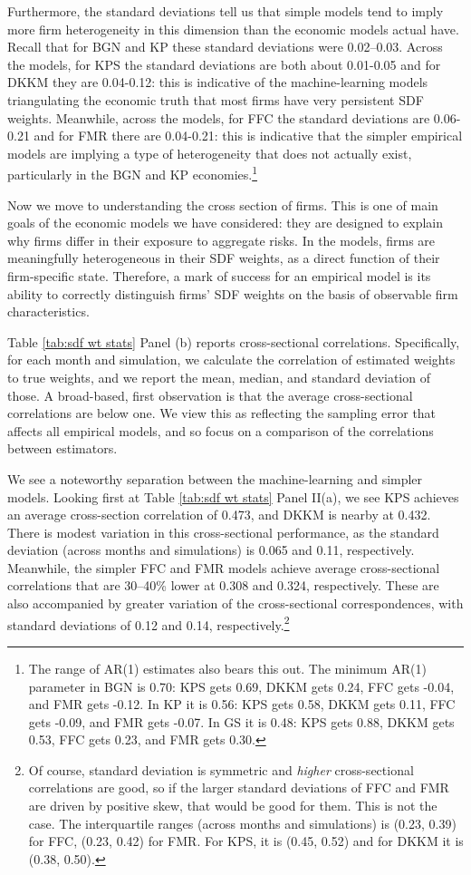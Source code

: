 \documentclass[12pt]{scrarticle}
\begin{document}
Furthermore, the standard deviations tell us that simple models tend to imply more firm heterogeneity in this dimension than the economic models actual have. Recall that for BGN and KP these standard deviations were 0.02--0.03. Across the models, for KPS the standard deviations are both about 0.01-0.05 and for DKKM they are 0.04-0.12: this is indicative of the machine-learning models triangulating the economic truth that most firms have very persistent SDF weights. Meanwhile, across the models, for FFC the standard deviations are 0.06-0.21 and for FMR there are 0.04-0.21: this is indicative that the simpler empirical models are implying a type of heterogeneity that does not actually exist, particularly in the BGN and KP economies.\footnote{The range of AR(1) estimates also bears this out. The minimum AR(1) parameter in BGN is 0.70: KPS gets 0.69, DKKM gets 0.24, FFC gets -0.04, and FMR gets -0.12. In KP it is 0.56: KPS gets 0.58, DKKM gets 0.11, FFC gets -0.09, and FMR gets -0.07. In GS it is 0.48: KPS gets 0.88, DKKM gets 0.53, FFC gets 0.23, and FMR gets 0.30.}

Now we move to understanding the cross section of firms. This is one of main goals of the economic models we have considered: they are designed to explain why firms differ in their exposure to aggregate risks. In the models, firms are meaningfully heterogeneous in their SDF weights, as a direct function of their firm-specific state. Therefore, a mark of success for an empirical model is its ability to correctly distinguish firms' SDF weights on the basis of observable firm characteristics.

Table \ref{tab:sdf wt stats} Panel (b) reports cross-sectional correlations. Specifically, for each month and simulation, we calculate the correlation of estimated weights to true weights, and we report the mean, median, and standard deviation of those. A broad-based, first observation is that the average cross-sectional correlations are below one. We view this as reflecting the sampling error that affects all empirical models, and so focus on a comparison of the correlations between estimators.

We see a noteworthy separation between the machine-learning and simpler models. Looking first at Table \ref{tab:sdf wt stats} Panel II(a), we see KPS achieves an average cross-section correlation of 0.473, and DKKM is nearby at 0.432. There is modest variation in this cross-sectional performance, as the standard deviation (across months and simulations) is 0.065 and 0.11, respectively. Meanwhile, the simpler FFC and FMR models achieve average cross-sectional correlations that are 30--40\% lower at 0.308 and 0.324, respectively. These are also accompanied by greater variation of the cross-sectional correspondences, with standard deviations of 0.12 and 0.14, respectively.\footnote{Of course, standard deviation is symmetric and \emph{higher} cross-sectional correlations are good, so if the larger standard deviations of FFC and FMR are driven by positive skew, that would be good for them. This is not the case. The interquartile ranges (across months and simulations) is (0.23, 0.39) for FFC, (0.23, 0.42) for FMR. For KPS, it is (0.45, 0.52) and for DKKM it is (0.38, 0.50).} 
\end{document}
